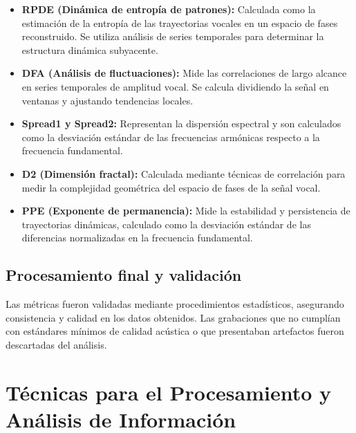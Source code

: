 \documentclass[listof=nochaptergap,12pt,times,authoryear]{report}
\begin{document}
\begin{itemize}
    \item \textbf{RPDE (Dinámica de entropía de patrones):} Calculada como la estimación de la entropía de las trayectorias vocales en un espacio de fases reconstruido. Se utiliza análisis de series temporales para determinar la estructura dinámica subyacente.

    \item \textbf{DFA (Análisis de fluctuaciones):} Mide las correlaciones de largo alcance en series temporales de amplitud vocal. Se calcula dividiendo la señal en ventanas y ajustando tendencias locales.

    \item \textbf{Spread1 y Spread2:} Representan la dispersión espectral y son calculados como la desviación estándar de las frecuencias armónicas respecto a la frecuencia fundamental.

    \item \textbf{D2 (Dimensión fractal):} Calculada mediante técnicas de correlación para medir la complejidad geométrica del espacio de fases de la señal vocal.

    \item \textbf{PPE (Exponente de permanencia):} Mide la estabilidad y persistencia de trayectorias dinámicas, calculado como la desviación estándar de las diferencias normalizadas en la frecuencia fundamental.
\end{itemize}

\subsection{Procesamiento final y validación}

Las métricas fueron validadas mediante procedimientos estadísticos, asegurando consistencia y calidad en los datos obtenidos. Las grabaciones que no cumplían con estándares mínimos de calidad acústica o que presentaban artefactos fueron descartadas del análisis.


\section{Técnicas para el Procesamiento y Análisis de Información}
\end{document}
